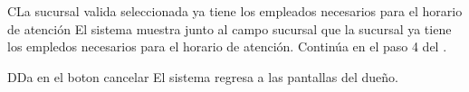 \begin{UCtrayectoriaA}{C}{La sucursal valida seleccionada ya tiene los empleados necesarios para el horario de atención}
			\UCpaso El sistema muestra junto al campo sucursal que la sucursal ya tiene los empledos necesarios para el horario de atención.
			\UCpaso Continúa en el paso 4 del .
		\end{UCtrayectoriaA}


\begin{UCtrayectoriaA}{D}{Da en el boton cancelar}
		\UCpaso El sistema regresa a las pantallas del dueño.
\end{UCtrayectoriaA}